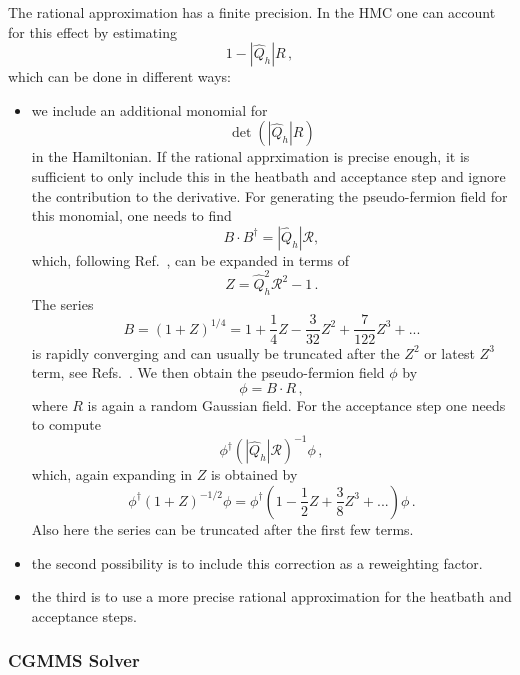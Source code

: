 The rational approximation has a finite precision. In the HMC one can
account for this effect by estimating
\[
1 - |\hat Q_h| R\,,
\]
which can be done in different ways:
\begin{itemize}
\item we include an additional monomial for
  \[
  \det (|\hat Q_h| R)
  \]
  in the Hamiltonian. If the rational apprximation is precise enough,
  it is sufficient to only include this in the heatbath and acceptance
  step and ignore the contribution to the derivative. For generating
  the pseudo-fermion field for this monomial, one needs to find
  \[
  B\cdot B^\dagger = |\hat Q_h| \mathcal{R},
  \]
  which, following Ref.~\cite{Luscher:2010ae}, can be expanded in
  terms of
  \[
  Z = \hat Q_h^2\mathcal{R}^2 -1\,.
  \]
  The series
  \[
  B = (1+Z)^{1/4} =  1 + \frac{1}{4} Z - \frac{3}{32} Z^2 + \frac{7}{122} Z^3 + ...
  \]
  is rapidly converging and can usually be truncated after the $Z^2$
  or latest $Z^3$ term, see
  Refs.~\cite{Luscher:2010ae,Luscher:2012av}. We then obtain the
  pseudo-fermion field $\phi$ by
  \[
  \phi = B\cdot R\,,
  \]
  where $R$ is again a random Gaussian field. For the acceptance step
  one needs to compute
  \[
  \phi^\dagger (|\hat Q_h|\mathcal{R})^{-1}\phi\,,
  \]
  which, again expanding in $Z$ is obtained by
  \[
  \phi^\dagger (1+Z)^{-1/2} \phi = \phi^\dagger (1 - \frac{1}{2}Z +
  \frac{3}{8}Z^3 + ...) \phi\, .
  \]
  Also here the series can be truncated after the first few terms.
\item the second possibility is to include this correction as a
  reweighting factor.
\item the third is to use a more precise rational approximation for
  the heatbath and acceptance steps.
\end{itemize}

\subsubsection{CGMMS Solver}

